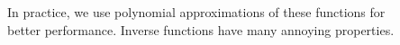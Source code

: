 \documentclass[preview]{standalone}
\begin{document}
\begin{center}
In practice, we use polynomial approximations of these functions for\\better performance. Inverse functions have many annoying properties.
\end{center}
\end{document}
